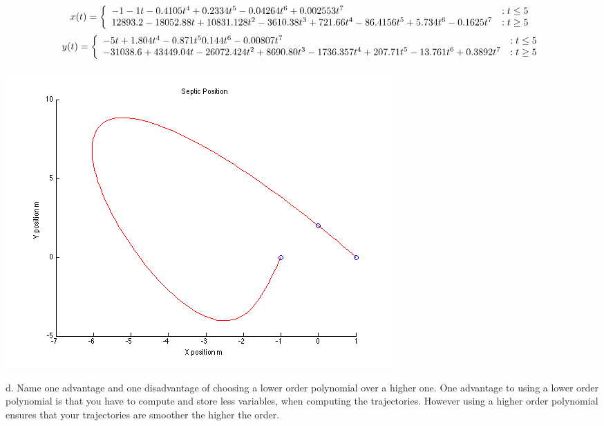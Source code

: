 \documentclass[english]{article}
\begin{document}
\paragraph{}
 \begin{displaymath}
   x(t) = \left\{
     \begin{array}{lr}
       $$ -1	-1t 	-0.4105t^4+	0.2334t^5 - 0.04264t^6 +	0.002553t^7 $$& : t \leq 5\\
       $$   12893.2 - 18052.88t	+ 10831.128t^2	- 3610.38t^3 +	721.66t^4 - 	  86.4156t^5+	5.734t^6 - 0.1625t^7 $$ & : t \geq 5
     \end{array}
   \right.
\end{displaymath} 
\begin{displaymath}
   y(t) = \left\{
     \begin{array}{lr}  
       $$-5t +1.804t^4	-0.871t^5	0.144t^6	-0.00807t^7$$& : t \leq 5\\
       $$ -31038.6	+43449.04t	-26072.424t^2+	8690.80t^3	- 1736.357t^4	 + 207.71t^5	- 13.761t^6	+ 0.3892t^7 $$ & : t \geq 5
     \end{array}
   \right.
\end{displaymath} 
\\
\includegraphics[width = \textwidth]{septic.png}

d. Name one advantage and one disadvantage of choosing a lower order polynomial over a higher one.  
One advantage to using a lower order polynomial is that you have to compute and store less variables, when computing the trajectories. However using a higher order polynomial ensures that your trajectories are smoother the higher the order. 
\end{document}

